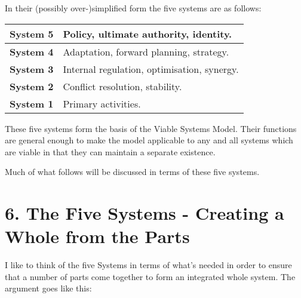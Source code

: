 In their (possibly over-)simplified form the five systems are as follows:

{\renewcommand{\arraystretch}{1.5} %
	\begin{tabular}{ | p{} | p{} | }
		\hline
		\textbf{System 5} & Policy, ultimate authority, identity. \\
		\hline
		\textbf{System 4} & Adaptation, forward planning, strategy. \\
		\hline
		\textbf{System 3} & Internal regulation, optimisation, synergy.  \\
		\hline
		\textbf{System 2} & Conflict resolution, stability. \\
		\hline
		\textbf{System 1} & Primary activities. \\
		\hline
	\end{tabular}
}

These five systems form the basis of the Viable Systems Model. Their functions are general enough to make the model applicable to any and all systems which are viable in that they can maintain a separate existence.

Much of what follows will be discussed in terms of these five systems.

\section*{6. The Five Systems - Creating a Whole from the Parts}
I like to think of the five Systems in terms of what's needed in order to ensure that a number of parts come together to form an integrated whole system. The argument goes like this:

